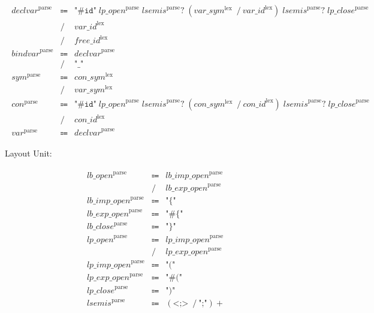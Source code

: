\begin{align*}
    \begin{array}{rcll}
        \mathit{declvar}^\mathrm{parse}
        &\Coloneq &\texttt{"\#id"}\; \mathit{lp\_open}^\mathrm{parse}\; \mathit{lsemis}^\mathrm{parse}{?}\; (\mathit{var\_sym}^\mathrm{lex}\; \mathrel{/} \mathit{var\_id}^\mathrm{lex})\; \mathit{lsemis}^\mathrm{parse}{?}\; \mathit{lp\_close}^\mathrm{parse} \\
        &\mathrel{/} &\mathit{var\_id}^\mathrm{lex} \\
        &\mathrel{/} &\mathit{free\_id}^\mathrm{lex} \\
        \mathit{bindvar}^\mathrm{parse}
        &\Coloneq &\mathit{declvar}^\mathrm{parse} \\
        &\mathrel{/} &\texttt{"\_"} \\
        \mathit{sym}^\mathrm{parse}
        &\Coloneq &\mathit{con\_sym}^\mathrm{lex} \\
        &\mathrel{/} &\mathit{var\_sym}^\mathrm{lex} \\
        \mathit{con}^\mathrm{parse}
        &\Coloneq &\texttt{"\#id"}\; \mathit{lp\_open}^\mathrm{parse}\; \mathit{lsemis}^\mathrm{parse}{?}\; (\mathit{con\_sym}^\mathrm{lex}\; \mathrel{/} \mathit{con\_id}^\mathrm{lex})\; \mathit{lsemis}^\mathrm{parse}{?}\; \mathit{lp\_close}^\mathrm{parse} \\
        &\mathrel{/} &\mathit{con\_id}^\mathrm{lex} \\
        \mathit{var}^\mathrm{parse}
        &\Coloneq &\mathit{declvar}^\mathrm{parse}
    \end{array}
\end{align*}

Layout Unit:

\begin{align*}
    \begin{array}{rcll}
        \mathit{lb\_open}^\mathrm{parse}
        &\Coloneq &\mathit{lb\_imp\_open}^\mathrm{parse} \\
        &\mathrel{/} &\mathit{lb\_exp\_open}^\mathrm{parse} \\
        \mathit{lb\_imp\_open}^\mathrm{parse}
        &\Coloneq &\texttt{"\{"} \\
        \mathit{lb\_exp\_open}^\mathrm{parse}
        &\Coloneq &\texttt{"\#\{"} \\
        \mathit{lb\_close}^\mathrm{parse}
        &\Coloneq &\texttt{"\}"} \\
        \mathit{lp\_open}^\mathrm{parse}
        &\Coloneq &\mathit{lp\_imp\_open}^\mathrm{parse} \\
        &\mathrel{/} &\mathit{lp\_exp\_open}^\mathrm{parse} \\
        \mathit{lp\_imp\_open}^\mathrm{parse}
        &\Coloneq &\texttt{"("} \\
        \mathit{lp\_exp\_open}^\mathrm{parse}
        &\Coloneq &\texttt{"\#("} \\
        \mathit{lp\_close}^\mathrm{parse}
        &\Coloneq &\texttt{")"} \\
        \mathit{lsemis}^\mathrm{parse}
        &\Coloneq &(\texttt{<;>}\; \mathrel{/} \texttt{";"}){+}
    \end{array}
\end{align*}

